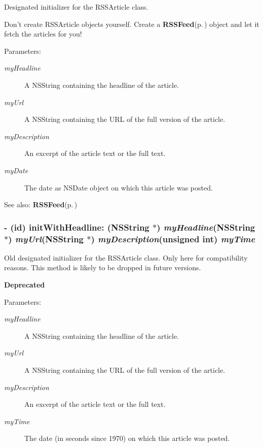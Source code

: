 Designated initializer for the RSSArticle class.

Don't create RSSArticle objects yourself. Create a {\bf RSSFeed}{\rm (p.\,\pageref{interfaceRSSFeed})} object and let it fetch the articles for you!

\begin{Desc}
\item[Parameters:]
\begin{description}
\item[{\em my\-Headline}]A NSString containing the headline of the article. \item[{\em my\-Url}]A NSString containing the URL of the full version of the article. \item[{\em my\-Description}]An excerpt of the article text or the full text. \item[{\em my\-Date}]The date as NSDate object on which this article was posted. \end{description}
\end{Desc}
\begin{Desc}
\item[See also:]{\bf RSSFeed}{\rm (p.\,\pageref{interfaceRSSFeed})}\end{Desc}
\subsubsection{\setlength{\rightskip}{0pt plus 5cm}- (id) init\-With\-Headline: (NSString $\ast$) {\em my\-Headline}(NSString $\ast$) {\em my\-Url}(NSString $\ast$) {\em my\-Description}(unsigned int) {\em my\-Time}}\label{interfaceRSSArticle_a2}


Old designated initializer for the RSSArticle class. Only here for compatibility reasons. This method is likely to be dropped in future versions. \begin{Desc}
\item[{\bf Deprecated}]\end{Desc}
\begin{Desc}
\item[Parameters:]
\begin{description}
\item[{\em my\-Headline}]A NSString containing the headline of the article. \item[{\em my\-Url}]A NSString containing the URL of the full version of the article. \item[{\em my\-Description}]An excerpt of the article text or the full text. \item[{\em my\-Time}]The date (in seconds since 1970) on which this article was posted.\end{description}
\end{Desc}
